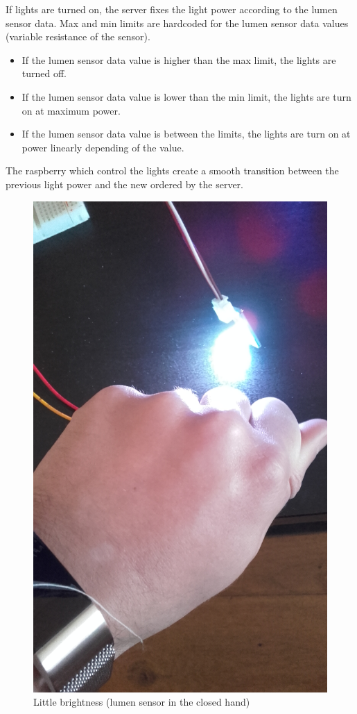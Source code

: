 \documentclass[10pt]{article}
\begin{document}
If lights are turned on, the server fixes the light power according to the lumen sensor data.
Max and min limits are hardcoded for the lumen sensor data values (variable resistance of the sensor).
\begin{itemize}
\item If the lumen sensor data value is higher than the max limit, the lights are turned off.
\item If the lumen sensor data value is lower than the min limit, the lights are turn on at maximum power.
\item If the lumen sensor data value is between the limits, the lights are turn on at power linearly depending of the value.
\end{itemize}

The raspberry which control the lights create a smooth transition between the previous light power and the new ordered by the server.

\begin{figure}[H]
  \centering
  \includegraphics[width=\textwidth]{../imgs/littleBrightness2.jpg}
  \caption{\label{littleBrightness}Little brightness (lumen sensor in the closed hand)}
\end{figure}
\end{document}

